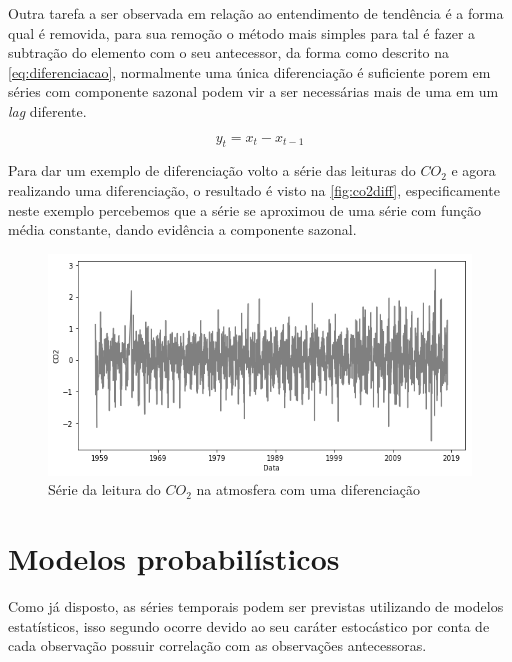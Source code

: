 \documentclass[
    12pt,
    oneside,
    a4paper,
    english,
    brazil
]{abntex2}
\begin{document}
Outra tarefa a ser observada em relação ao entendimento de tendência é a forma
qual é removida, para sua remoção o método mais simples para tal é fazer a
subtração do elemento com o seu antecessor, da forma como descrito na
\autoref{eq:diferenciacao}, normalmente uma única diferenciação é suficiente
porem em séries com componente sazonal podem vir a ser necessárias mais de uma
em um \textit{lag} diferente.

\begin{equation}
    \label{eq:diferenciacao}
    y_t = x_t - x_{t-1}
\end{equation}

Para dar um exemplo de diferenciação volto a série das leituras do $CO_2$ e
agora realizando uma diferenciação, o resultado é visto na
\autoref{fig:co2diff}, especificamente neste exemplo percebemos que a série se
aproximou de uma série com função média constante, dando evidência a componente
sazonal.

\begin{figure}
    \centering
    \caption{Série da leitura do $CO_2$ na atmosfera com uma
        diferenciação}\label{fig:co2diff}
    \includegraphics[width=.6\linewidth]{images/co2_diff.png}
\end{figure}

%


\section{Modelos probabilísticos}

Como já disposto, as séries temporais podem ser previstas utilizando de modelos
estatísticos, isso segundo  ocorre devido ao seu caráter
estocástico por conta de cada observação possuir correlação com as observações
antecessoras.
\end{document}
